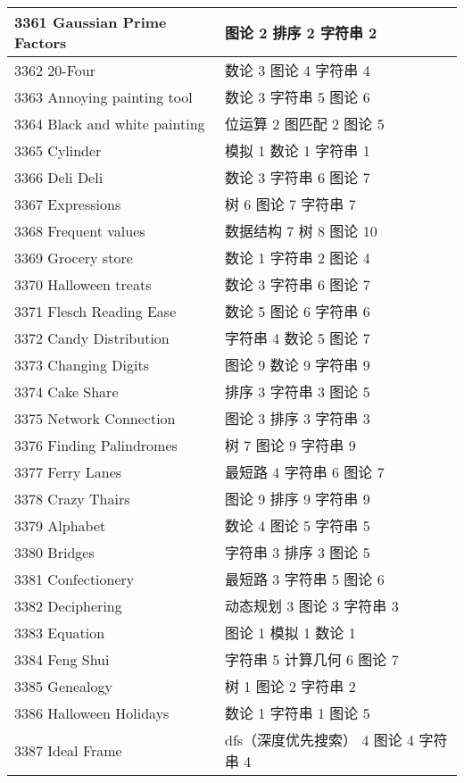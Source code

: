 \begin{longtable}{| p{} | p{} |}
 3361 Gaussian Prime Factors  & 图论 2 排序 2 字符串 2 \\ \hline
 3362 20-Four  & 数论 3 图论 4 字符串 4 \\ \hline
 3363 Annoying painting tool  & 数论 3 字符串 5 图论 6 \\ \hline
 3364 Black and white painting  & 位运算 2 图匹配 2 图论 5 \\ \hline
 3365 Cylinder  & 模拟 1 数论 1 字符串 1 \\ \hline
 3366 Deli Deli  & 数论 3 字符串 6 图论 7 \\ \hline
 3367 Expressions  & 树 6 图论 7 字符串 7 \\ \hline
 3368 Frequent values  & 数据结构 7 树 8 图论 10 \\ \hline
 3369 Grocery store  & 数论 1 字符串 2 图论 4 \\ \hline
 3370 Halloween treats  & 数论 3 字符串 6 图论 7 \\ \hline
 3371 Flesch Reading Ease  & 数论 5 图论 6 字符串 6 \\ \hline
 3372 Candy Distribution  & 字符串 4 数论 5 图论 7 \\ \hline
 3373 Changing Digits  & 图论 9 数论 9 字符串 9 \\ \hline
 3374 Cake Share  & 排序 3 字符串 3 图论 5 \\ \hline
 3375 Network Connection  & 图论 3 排序 3 字符串 3 \\ \hline
 3376 Finding Palindromes  & 树 7 图论 9 字符串 9 \\ \hline
 3377 Ferry Lanes  & 最短路 4 字符串 6 图论 7 \\ \hline
 3378 Crazy Thairs  & 图论 9 排序 9 字符串 9 \\ \hline
 3379 Alphabet  & 数论 4 图论 5 字符串 5 \\ \hline
 3380 Bridges  & 字符串 3 排序 3 图论 5 \\ \hline
 3381 Confectionery  & 最短路 3 字符串 5 图论 6 \\ \hline
 3382 Deciphering  & 动态规划 3 图论 3 字符串 3 \\ \hline
 3383 Equation  & 图论 1 模拟 1 数论 1 \\ \hline
 3384 Feng Shui  & 字符串 5 计算几何 6 图论 7 \\ \hline
 3385 Genealogy  & 树 1 图论 2 字符串 2 \\ \hline
 3386 Halloween Holidays  & 数论 1 字符串 1 图论 5 \\ \hline
 3387 Ideal Frame  & dfs（深度优先搜索） 4 图论 4 字符串 4 \\ \hline

\end{longtable}
